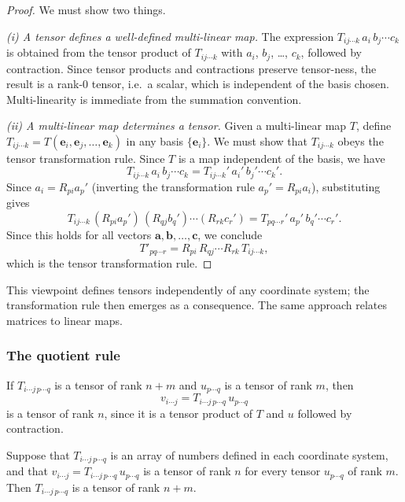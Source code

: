 \documentclass[a4paper]{article}
\begin{document}
\begin{proof}
  We must show two things.

  \emph{(i) A tensor defines a well-defined multi-linear map.} The expression $T_{ij\cdots k}\,a_i\,b_j\cdots c_k$ is obtained from the tensor product of $T_{ij\cdots k}$ with $a_i$, $b_j$, \ldots, $c_k$, followed by contraction. Since tensor products and contractions preserve tensor-ness, the result is a rank-0 tensor, i.e.\ a scalar, which is independent of the basis chosen. Multi-linearity is immediate from the summation convention.

  \emph{(ii) A multi-linear map determines a tensor.} Given a multi-linear map $T$, define $T_{ij\cdots k} = T(\mathbf{e}_i, \mathbf{e}_j, \ldots, \mathbf{e}_k)$ in any basis $\{\mathbf{e}_i\}$. We must show that $T_{ij\cdots k}$ obeys the tensor transformation rule. Since $T$ is a map independent of the basis, we have
  \[
    T_{ij \cdots k}\, a_i\, b_j\cdots c_k = T_{ij\cdots k}'\, a_i'\, b_j' \cdots c_k'.
  \]
  Since $a_i = R_{pi} a_p'$ (inverting the transformation rule $a_p' = R_{pi}a_i$), substituting gives
  \[
    T_{ij\cdots k}\, (R_{pi}a_p')\,(R_{qj}b_q')\cdots (R_{rk}c_r') = T_{pq\cdots r}'\, a_p'\, b_q' \cdots c_r'.
  \]
  Since this holds for all vectors $\mathbf{a}, \mathbf{b}, \ldots, \mathbf{c}$, we conclude
  \[
    T'_{pq\cdots r} = R_{pi}\,R_{qj}\cdots R_{rk}\, T_{ij\cdots k},
  \]
  which is the tensor transformation rule.
\end{proof}

\begin{rmk}
  This viewpoint defines tensors independently of any coordinate system; the transformation rule then emerges as a consequence. The same approach relates matrices to linear maps.
\end{rmk}

\subsubsection*{The quotient rule}

\begin{prop}
  If $T_{i\cdots j\, p\cdots q}$ is a tensor of rank $n + m$ and $u_{p\cdots q}$ is a tensor of rank $m$, then
  \[
    v_{i\cdots j} = T_{i\cdots j\, p\cdots q}\, u_{p\cdots q}
  \]
  is a tensor of rank $n$, since it is a tensor product of $T$ and $u$ followed by contraction.
\end{prop}

\begin{prop}
  Suppose that $T_{i\cdots j\,p\cdots q}$ is an array of numbers defined in each coordinate system, and that $v_{i\cdots j} = T_{i\cdots j\,p\cdots q}\, u_{p\cdots q}$ is a tensor of rank $n$ for every tensor $u_{p \cdots q}$ of rank $m$. Then $T_{i\cdots j\, p\cdots q}$ is a tensor of rank $n + m$.
\end{prop}
\end{document}
